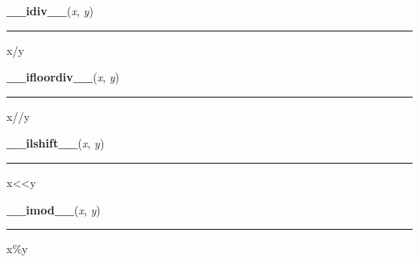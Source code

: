     \begin{boxedminipage}{\textwidth}

    \raggedright \textbf{\_\_idiv\_\_}(\textit{x}, \textit{y})

    \vspace{-1.5ex}

    \rule{\textwidth}{0.5\fboxrule}

x/y
    \vspace{1ex}

    \end{boxedminipage}

    \label{numpy:ndarray:__ifloordiv__}

    \vspace{0.5ex}

    \begin{boxedminipage}{\textwidth}

    \raggedright \textbf{\_\_ifloordiv\_\_}(\textit{x}, \textit{y})

    \vspace{-1.5ex}

    \rule{\textwidth}{0.5\fboxrule}

x//y
    \vspace{1ex}

    \end{boxedminipage}

    \label{numpy:ndarray:__ilshift__}

    \vspace{0.5ex}

    \begin{boxedminipage}{\textwidth}

    \raggedright \textbf{\_\_ilshift\_\_}(\textit{x}, \textit{y})

    \vspace{-1.5ex}

    \rule{\textwidth}{0.5\fboxrule}

x{\textless}{\textless}y
    \vspace{1ex}

    \end{boxedminipage}

    \label{numpy:ndarray:__imod__}

    \vspace{0.5ex}

    \begin{boxedminipage}{\textwidth}

    \raggedright \textbf{\_\_imod\_\_}(\textit{x}, \textit{y})

    \vspace{-1.5ex}

    \rule{\textwidth}{0.5\fboxrule}

x{\%}y
    \vspace{1ex}

    \end{boxedminipage}

